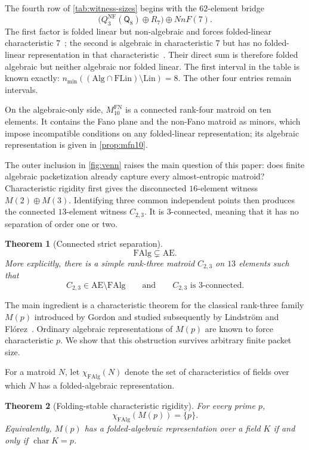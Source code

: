 \documentclass[11pt]{article}
\newtheorem{theorem}{Theorem}[section]
\theoremstyle{definition}
\newcommand{\FAlg}{\mathrm{FAlg}}
\newcommand{\FLin}{\mathrm{FLin}}
\newcommand{\Alg}{\mathrm{Alg}}
\newcommand{\Lin}{\mathrm{Lin}}
\newcommand{\AlmostEnt}{\mathrm{AE}}
\begin{document}
The fourth row of \cref{tab:witness-sizes} begins with the $62$-element bridge
\[
\bigl(Q^{\mathrm{NF}}_3(\mathsf Q_8)\oplus R_7\bigr)\oplus NnF(7).
\]
The first factor is folded linear but non-algebraic and forces folded-linear characteristic $7$~\cite{BenEfraim2016}; the second is algebraic in characteristic $7$ but has no folded-linear representation in that characteristic~\cite{SharififarEtAl2024}.  Their direct sum is therefore folded algebraic but neither algebraic nor folded linear.  The first interval in the table is known exactly: $n_{\min}((\Alg\cap\FLin)\setminus\Lin)=8$.  The other four entries remain intervals.

On the algebraic-only side, $M^{\mathrm{FN}}_{10}$ is a connected rank-four matroid on ten elements.  It contains the Fano plane and the non-Fano matroid as minors, which impose incompatible conditions on any folded-linear representation; its algebraic representation is given in \cref{prop:mfn10}.

The outer inclusion in \cref{fig:venn} raises the main question of this paper: does finite algebraic packetization already capture every almost-entropic matroid?  Characteristic rigidity first gives the disconnected $16$-element witness $M(2)\oplus M(3)$.  Identifying three common independent points then produces the connected $13$-element witness $C_{2,3}$.  It is $3$-connected, meaning that it has no separation of order one or two.

\begin{theorem}[Connected strict separation]\label{thm:intro-strict}
\[
\FAlg\subsetneq\AlmostEnt.
\]
More explicitly, there is a simple rank-three matroid $C_{2,3}$ on $13$ elements such that
\[
C_{2,3}\in\AlmostEnt\setminus\FAlg
\qquad\text{and}\qquad
C_{2,3}\text{ is $3$-connected}.
\]
\end{theorem}

The main ingredient is a characteristic theorem for the classical rank-three family $M(p)$ introduced by Gordon and studied subsequently by Lindstr\"om and Fl\'orez~\cite{Gordon1988,Lindstrom1985,Florez2006}.  Ordinary algebraic representations of $M(p)$ are known to force characteristic $p$.  We show that this obstruction survives arbitrary finite packet size.

For a matroid $N$, let $\chi_{\FAlg}(N)$ denote the set of characteristics of fields over which $N$ has a folded-algebraic representation.

\begin{theorem}[Folding-stable characteristic rigidity]\label{thm:intro-singleton}
For every prime $p$,
\[
\chi_{\FAlg}(M(p))=\{p\}.
\]
Equivalently, $M(p)$ has a folded-algebraic representation over a field $K$ if and only if $\operatorname{char}K=p$.
\end{theorem}
\end{document}
